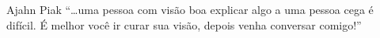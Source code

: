 
\begin{quotepage}{0.5\linewidth}{Ajahn Piak}
“\ldots{}uma pessoa com visão boa explicar algo a uma pessoa cega é difícil. É
melhor você ir curar sua visão, depois venha conversar comigo!”
\end{quotepage}

